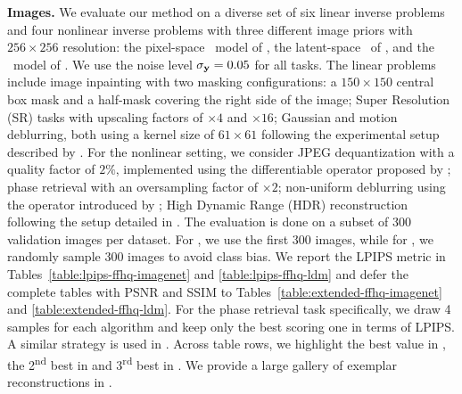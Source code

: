 \textbf{Images.} 
We evaluate our method on a diverse set of six linear inverse problems and four nonlinear inverse problems with three different image priors with $256\times256$ resolution: the pixel-space \ffhq\ model of \citet{choi2021ilvr}, the latent-space \ffhq\ of  \citet{rombach2022high}, and the \imagenet\ model of \citet{dhariwal2021diffusion}. We use the noise level $\sigma_{\mathbf{y}} = 0.05$ for all tasks. The linear problems include image inpainting with two masking configurations: a $150 \times 150$ central box mask and a half-mask covering the right side of the image; Super Resolution (SR) tasks with upscaling factors of $\times 4$ and $\times 16$;
Gaussian and motion deblurring, both using a kernel size of $61 \times 61$ following the experimental setup described by \citet[Section 4]{chung2023diffusion}.
For the nonlinear setting, we consider JPEG dequantization with a quality factor of $2\%$, implemented using the differentiable operator proposed by \citet{shin2017jpeg}; phase retrieval with an oversampling factor of $\times 2$; non-uniform deblurring using the operator introduced by \citet{tran2021non-uniform-deblurring}; High Dynamic Range (HDR) reconstruction following the setup detailed in \citet[Section 5.2]{mardani2024a}. The evaluation is done on a subset of 300 validation images per dataset. For \ffhq, we use the first 300 images, while for \imagenet, we randomly sample 300 images to avoid class bias. We report the LPIPS metric \cite{zhang2018lpips} in Tables~\ref{table:lpips-ffhq-imagenet} and \ref{table:lpips-ffhq-ldm} and defer the complete tables with PSNR and SSIM to Tables~\ref{table:extended-ffhq-imagenet} and \ref{table:extended-ffhq-ldm}. For the phase retrieval task specifically, we draw 4 samples for each algorithm and keep only the best scoring one in terms of LPIPS. A similar strategy is used in \cite{chung2023diffusion,zhang2024daps,wu2024principled}. 
Across table rows, we highlight the best value in , the 2\textsuperscript{nd} best in  and 3\textsuperscript{rd} best in . We provide a large gallery of exemplar reconstructions in . 

